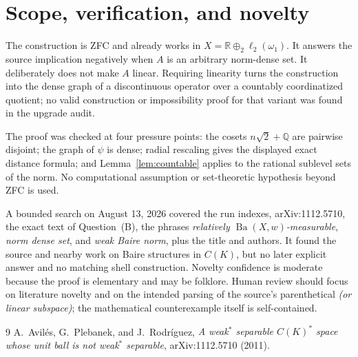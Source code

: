 \documentclass[11pt]{article}
\theoremstyle{remark}
\newcommand{\Ba}{\operatorname{Ba}}
\newcommand{\R}{\mathbb{R}}
\newcommand{\Q}{\mathbb{Q}}
\begin{document}
\section{Scope, verification, and novelty}

The construction is ZFC and already works in
\(X=\R\oplus_2\ell_2(\omega_1)\).  It answers the source implication
negatively when \(A\) is an arbitrary norm-dense set.  It deliberately does
not make \(A\) linear.  Requiring linearity turns the construction into the
dense graph of a discontinuous operator over a countably coordinatized
quotient; no valid construction or impossibility proof for that variant was
found in the upgrade audit.

The proof was checked at four pressure points: the cosets \(n\sqrt2+\Q\) are
pairwise disjoint; the graph of \(\psi\) is dense; radial rescaling gives the
displayed exact distance formula; and Lemma~\ref{lem:countable} applies to
the rational sublevel sets of the norm.  No computational assumption or
set-theoretic hypothesis beyond ZFC is used.

A bounded search on August 13, 2026 covered the run indexes, arXiv:1112.5710,
the exact text of Question~(B), the phrases \emph{relatively
\(\Ba(X,w)\)-measurable}, \emph{norm dense set}, and \emph{weak Baire norm},
plus the title and authors.  It found the source and nearby work on Baire
structures in \(C(K)\), but no later explicit answer and no matching shell
construction.  Novelty confidence is moderate because the proof is
elementary and may be folklore.  Human review should focus on literature
novelty and on the intended parsing of the source's parenthetical
\emph{(or linear subspace)}; the mathematical counterexample itself is
self-contained.

\begin{thebibliography}{9}
A.~Avil\'es, G.~Plebanek, and J.~Rodr\'iguez,
\emph{A weak\(^{*}\) separable \(C(K)^{*}\) space whose unit ball is not
weak\(^{*}\) separable}, arXiv:1112.5710 (2011).
\end{thebibliography}
\end{document}
